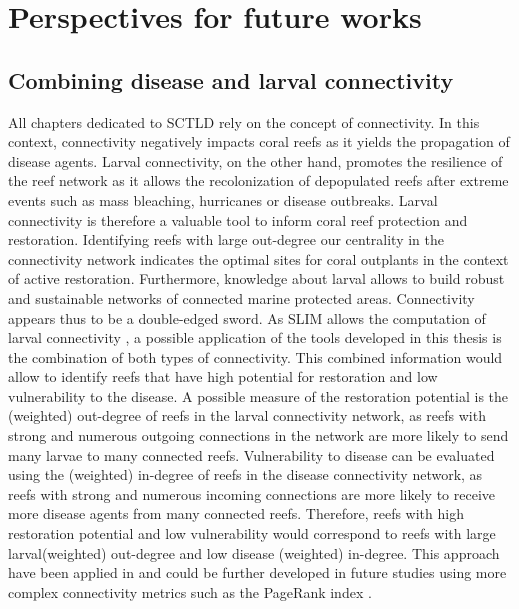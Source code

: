 \section{Perspectives for future works}

\subsection*{Combining disease and larval connectivity}
All chapters dedicated to SCTLD rely on the concept of connectivity. In this context, connectivity negatively impacts coral reefs as it yields the propagation of disease agents. Larval connectivity, on the other hand, promotes the resilience of the reef network as it allows the recolonization of depopulated reefs after extreme events such as mass bleaching, hurricanes or disease outbreaks. Larval connectivity is therefore a valuable tool to inform coral reef protection and restoration. Identifying reefs with large out-degree our centrality in the connectivity network indicates the optimal sites for coral outplants in the context of active restoration. Furthermore, knowledge about larval allows to build robust and sustainable networks of connected marine protected areas. Connectivity appears thus to be a double-edged sword. As SLIM allows the computation of larval connectivity \citep{thomas2014numerical,frys2020fine}, a possible application of the tools developed in this thesis is the combination of both types of connectivity.  This combined information would allow to identify reefs that have high potential for restoration and low vulnerability to the disease. A possible measure of the restoration potential is the (weighted) out-degree of reefs in the larval connectivity network, as reefs with strong and numerous outgoing connections in the network are more likely to send many larvae to many connected reefs. Vulnerability to disease can be evaluated using the (weighted) in-degree of reefs in the disease connectivity network, as reefs with strong and numerous incoming connections are more likely to receive more disease agents from many connected reefs. Therefore, reefs with high restoration potential and low vulnerability would correspond to reefs with large larval(weighted) out-degree and low disease (weighted) in-degree. This approach have been applied in \cite{holstein2022} and could be further developed in future studies using more complex connectivity metrics such as the PageRank index \citep{frys2020fine}. 

